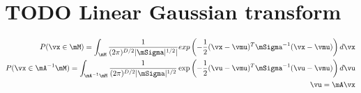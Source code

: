 \section{TODO Linear Gaussian transform}


\begin{align}
  P(\vx \in \mM) = \int_\mM \frac{1}{(2 \pi)^{D/2} |\mSigma|^{1/2}|} exp \left(-\frac{1}{2} (\vx - \vmu)^T \mSigma^{-1} (\vx - \vmu) \right) d \vx \\
  P(\vx \in \mA^{-1} \mM) = \int_{\mA^{-1} \mM} \frac{1}{(2 \pi)^{D/2} |\mSigma|^{1/2}} \exp \left(-\frac{1}{2} (\vu - \vmu)^T \mSigma^{-1} (\vu - \vmu) \right) d \vu \\
  \vu = \mA \vx
\end{align}

%


